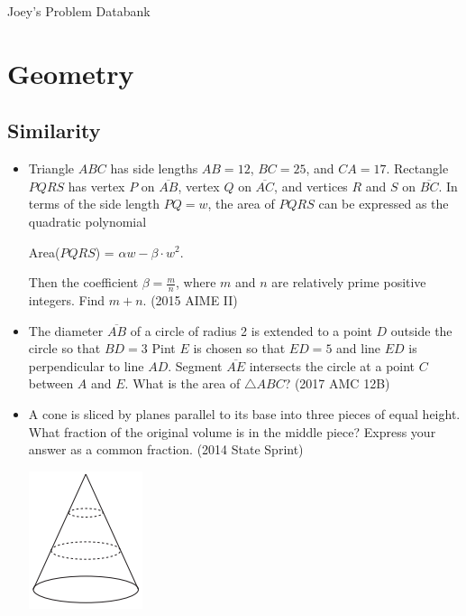 \documentclass{article}
\begin{document}
\centerline{\Huge{Joey's Problem Databank}}
\vskip0.26in
\tableofcontents


\clearpage




\section{Geometry}





\subsection{Similarity}

\begin{itemize}

\item Triangle $ABC$ has side lengths $AB = 12$, $BC = 25$, and $CA = 17$. Rectangle $PQRS$ has vertex $P$ on $\overline{AB}$, vertex $Q$ on $\overline{AC}$, and vertices $R$ and $S$ on $\overline{BC}$. In terms of the side length $PQ = w$, the area of $PQRS$ can be expressed as the quadratic polynomial

Area($PQRS$) = $\alpha w - \beta \cdot w^2$.

Then the coefficient $\beta = \frac{m}{n}$, where $m$ and $n$ are relatively prime positive integers. Find $m+n$. (2015 AIME II)

\item The diameter $\overline{AB}$ of a circle of radius 2 is extended to a point $D$ outside the circle so that $BD=3$ Pint $E$ is chosen so that $ED=5$ and line $ED$ is perpendicular to line $AD$. Segment $\overline{AE}$ intersects the circle at a point $C$ between $A$ and $E$. What is the area of $\triangle ABC$? (2017 AMC 12B)

\item A cone is sliced by planes parallel to its base into three pieces of equal height. What fraction of the original volume is in the middle piece? Express your answer as a common fraction. (2014 State Sprint)

\centerline{\includegraphics{201416.png}}




\end{itemize}
\end{document}
